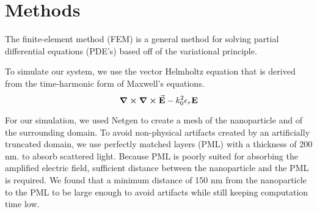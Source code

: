\documentclass{article}
\begin{document}
\section{Methods}
    The finite-element method (FEM) is a general method for solving partial differential equations (PDE's) based off of the variational principle. 

    To simulate our system, we use the vector Helmholtz equation that is derived from the time-harmonic form of Maxwell's equations. 
    \begin{equation}
        \curl \curl \vec{\textbf{E}} - k_0^2\epsilon_r\textbf{E}
    \end{equation}

    For our simulation, we used Netgen to create a mesh of the nanoparticle and of the surrounding domain. To avoid non-physical artifacts created by an artificially truncated domain, we use perfectly matched layers (PML) with a thickness of 200 nm. to absorb scattered light. Because PML is poorly suited for absorbing the amplified electric field, sufficient distance between the nanoparticle and the PML is required. We found that a minimum distance of 150 nm from the nanoparticle to the PML to be large enough to avoid artifacts while still keeping computation time low. 
\end{document}
